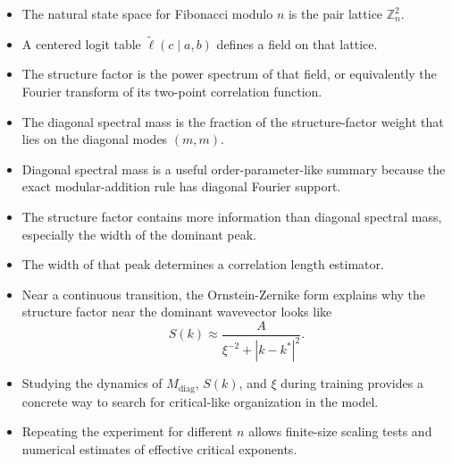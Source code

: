 \documentclass[11pt]{article}
\newcommand{\Zn}{\mathbb{Z}_n}
\newcommand{\diag}{\mathrm{diag}}
\begin{document}
\begin{itemize}
    \item The natural state space for Fibonacci modulo $n$ is the pair lattice $\Zn^2$.
    \item A centered logit table $\widetilde{\ell}(c\mid a,b)$ defines a field on that lattice.
    \item The structure factor is the power spectrum of that field, or equivalently the Fourier transform of its two-point correlation function.
    \item The diagonal spectral mass is the fraction of the structure-factor weight that lies on the diagonal modes $(m,m)$.
    \item Diagonal spectral mass is a useful order-parameter-like summary because the exact modular-addition rule has diagonal Fourier support.
    \item The structure factor contains more information than diagonal spectral mass, especially the width of the dominant peak.
    \item The width of that peak determines a correlation length estimator.
    \item Near a continuous transition, the Ornstein-Zernike form explains why the structure factor near the dominant wavevector looks like
    \begin{equation}
        S(k) \approx \frac{A}{\xi^{-2}+|k-k^*|^2}.
    \end{equation}
    \item Studying the dynamics of $M_{\diag}$, $S(k)$, and $\xi$ during training provides a concrete way to search for critical-like organization in the model.
    \item Repeating the experiment for different $n$ allows finite-size scaling tests and numerical estimates of effective critical exponents.
\end{itemize}
\end{document}
